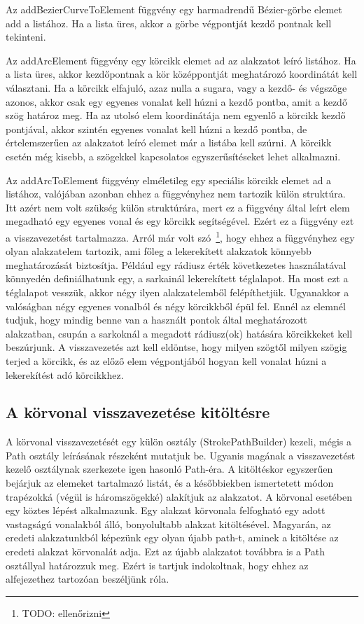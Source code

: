 \documentclass[12pt]{report}
\theoremstyle{definition}
\newcommand{\func}[1]{{\textsf{\footnotesize{#1}}}}
\begin{document}
Az \func{addBezierCurveToElement} függvény egy harmadrendű
Bézier-görbe elemet add a listához. Ha a lista üres, akkor a görbe
végpontját kezdő pontnak kell tekinteni.

Az \func{addArcElement} függvény egy körcikk elemet ad az alakzatot leíró
listához. Ha a lista üres, akkor kezdőpontnak a kör középpontját meghatározó
koordinátát kell választani. Ha a körcikk elfajuló, azaz nulla a sugara, vagy a
kezdő- és végszöge azonos, akkor csak egy egyenes vonalat kell húzni a kezdő
pontba, amit a kezdő szög határoz meg. Ha az utolsó elem koordinátája nem
egyenlő a körcikk kezdő pontjával, akkor szintén egyenes vonalat kell
húzni a kezdő pontba, de értelemszerűen az alakzatot leíró elemet már a
listába kell szúrni. A körcikk esetén még kisebb, a szögekkel kapcsolatos
egyszerűsítéseket lehet alkalmazni.

Az \func{addArcToElement} függvény elméletileg egy speciális körcikk elemet ad
a listához, valójában azonban ehhez a függvényhez nem tartozik külön struktúra.
Itt azért nem volt szükség külön struktúrára, mert ez a függvény által leírt
elem megadható egy egyenes vonal és egy körcikk segítségével. Ezért ez a
függvény ezt a visszavezetést tartalmazza. Arról már volt szó~\footnote{TODO:
ellenőrizni}, hogy ehhez a függvényhez egy olyan alakzatelem tartozik, ami
főleg a lekerekített alakzatok könnyebb meghatározását biztosítja. Például egy
rádiusz érték következetes használatával könnyedén definiálhatunk egy, a
sarkainál lekerekített téglalapot. Ha most ezt a téglalapot vesszük, akkor négy
ilyen alakzatelemből felépíthetjük. Ugyanakkor a valóságban négy egyenes
vonalból és négy körcikkből épül fel. Ennél az elemnél tudjuk, hogy mindig
benne van a használt pontok által meghatározott alakzatban, csupán a sarkoknál
a megadott rádiusz(ok) hatására körcikkeket kell beszúrjunk. A visszavezetés
azt kell eldöntse, hogy milyen szögtől milyen szögig terjed a körcikk, és az
előző elem végpontjából hogyan kell vonalat húzni a lekerekítést adó
körcikkhez.

    \subsection[A körvonal visszavezetése]{A körvonal visszavezetése kitöltésre}

A körvonal visszavezetését egy külön osztály (\func{StrokePathBuilder}) kezeli,
mégis a \func{Path} osztály leírásának részeként mutatjuk be. Ugyanis
magának a visszavezetést kezelő osztálynak szerkezete igen hasonló
\func{Path}-éra. A kitöltéskor egyszerűen bejárjuk az elemeket tartalmazó
listát, és a későbbiekben ismertetett módon trapézokká (végül is háromszögekké)
alakítjuk az alakzatot. A körvonal esetében egy köztes lépést alkalmazunk. Egy
alakzat körvonala felfogható egy adott vastagságú vonalakból álló, bonyolultabb
alakzat kitöltésével. Magyarán, az eredeti alakzatunkból képezünk egy olyan
újabb path-t, aminek a kitöltése az eredeti alakzat körvonalát adja. Ezt az
újabb alakzatot továbbra is a \func{Path} osztállyal határozzuk meg. Ezért is
tartjuk indokoltnak, hogy ehhez az alfejezethez tartozóan beszéljünk róla.
\end{document}
